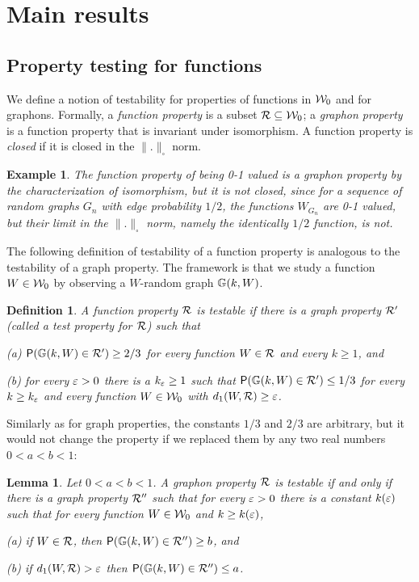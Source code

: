 \documentclass{article}
\newtheorem{lemma}[theorem]{Lemma}
\newtheorem{definition}[theorem]{Definition}
\newtheorem{example}[theorem]{Example}
\begin{document}
\section{Main results}

\subsection{Property testing for functions}

We define a notion of testability for properties of functions in
$\mathcal{W}_0$ and for graphons. Formally, a {\it function property} is a
subset $\mathcal{R}\subseteq\mathcal{W}_0$; a {\it graphon property} is a function
property that is invariant under isomorphism. A function property is
{\it closed} if it is closed in the $\|.\|_\square$ norm.

\begin{example}\label{EXA:01}
The function property of being 0-1 valued is a graphon property by
the characterization of isomorphism, but it is not closed, since for
a sequence of random graphs $G_n$ with edge probability $1/2$, the
functions $W_{G_n}$ are 0-1 valued, but their limit in the
$\|.\|_\square$ norm, namely the identically $1/2$ function, is not.
\end{example}

The following definition of testability of a function property is
analogous to the testability of a graph property. The framework is
that we study a function $W\in\mathcal{W}_0$ by observing a $W$-random
graph ${\mathbb G}(k,W)$.

\begin{definition}
A function property $\mathcal{R}$ is {\it testable} if there is a graph
property $\mathcal{R}'$ (called a {\it test property} for $\mathcal{R}$) such that

\smallskip

(a) ${\sf P}({\mathbb G}(k,W)\in\mathcal{R}') \ge 2/3$ for every function $W\in\mathcal{R}$ and
every $k\ge 1$, and

\smallskip

(b) for every $\varepsilon>0$ there is a $k_\varepsilon\ge 1$ such that
${\sf P}({\mathbb G}(k,W)\in\mathcal{R}') \le 1/3$ for every $k\ge k_\varepsilon$ and every
function $W\in\mathcal{W}_0$ with $d_1(W,\mathcal{R})\ge \varepsilon$.
\end{definition}

Similarly as for graph properties, the constants $1/3$ and $2/3$ are
arbitrary, but it would not change the property if we replaced them
by any two real numbers $0<a<b<1$:

\begin{lemma}\label{CONSTANTS}
Let $0<a<b<1$. A graphon property $\mathcal{R}$ is testable if and only if
there is a graph property $\mathcal{R}''$ such that for every $\varepsilon>0$ there
is a constant $k(\varepsilon)$ such that for every function $W\in\mathcal{W}_0$ and
$k\ge k(\varepsilon)$,

\smallskip

(a) if $W\in\mathcal{R}$, then ${\sf P}({\mathbb G}(k,W)\in\mathcal{R}'') \ge b$, and

\smallskip

(b) if $d_1(W,\mathcal{R})>\varepsilon$ then ${\sf P}({\mathbb G}(k,W)\in\mathcal{R}'') \le a$.
\end{lemma}
\end{document}
